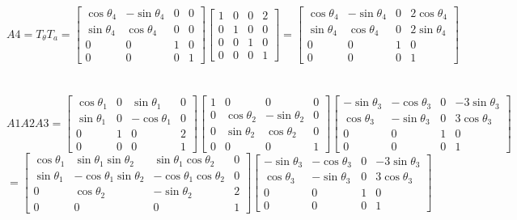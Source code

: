 \documentclass{article}
\begin{document}
\[
A4=T_{\theta}T_{a}
=
\begin{bmatrix}
\cos \theta_{4} & - \sin \theta_{4} & 0 & 0 \\
\sin \theta_{4} & \cos \theta_{4} & 0 & 0 \\
0 & 0 & 1 & 0 \\
0 & 0 & 0 & 1
\end{bmatrix}
\begin{bmatrix}
1 & 0 & 0 & 2 \\
0 & 1 & 0 & 0 \\
0 & 0 & 1 & 0 \\
0 & 0 & 0 & 1
\end{bmatrix}
=
\begin{bmatrix}
\cos \theta_{4} & - \sin \theta_{4} & 0 & 2\cos \theta_{4} \\
\sin \theta_{4} & \cos \theta_{4} & 0 & 2\sin \theta_{4} \\
0 & 0 & 1 & 0 \\
0 & 0 & 0 & 1
\end{bmatrix}
\]
\\
\\
\[
A1A2A3=
\begin{bmatrix}
\cos \theta_{1} & 0 & \sin \theta_{1} & 0 \\
\sin \theta_{1} & 0 & - \cos \theta_{1} & 0 \\
0 & 1 & 0 & 2 \\
0 & 0 & 0 & 1
\end{bmatrix}
\begin{bmatrix}
1 & 0 & 0 & 0 \\
0 & \cos \theta_{2} & - \sin \theta_{2} & 0 \\
0 & \sin \theta_{2} & \cos \theta_{2} & 0 \\
0 & 0 & 0 & 1
\end{bmatrix}
\begin{bmatrix}
- \sin \theta_{3} & - \cos \theta_{3} & 0 & - 3\sin \theta_{3} \\
\cos \theta_{3} & - \sin \theta_{3} & 0 & 3\cos \theta_{3} \\
0 & 0 & 1 & 0 \\
0 & 0 & 0 & 1
\end{bmatrix}
\]
\[
=
\begin{bmatrix}
\cos \theta_{1} & \sin \theta_{1}\sin \theta_{2} & \sin \theta_{1}\cos \theta_{2} & 0 \\
\sin \theta_{1} & - \cos \theta_{1}\sin \theta_{2} & - \cos \theta_{1}\cos \theta_{2} & 0 \\
0 & \cos \theta_{2} & - \sin \theta_{2} & 2 \\
0 & 0 & 0 & 1
\end{bmatrix}
\begin{bmatrix}
- \sin \theta_{3} & - \cos \theta_{3} & 0 & - 3\sin \theta_{3} \\
\cos \theta_{3} & - \sin \theta_{3} & 0 & 3\cos \theta_{3} \\
0 & 0 & 1 & 0 \\
0 & 0 & 0 & 1
\end{bmatrix}
\]
\end{document}
